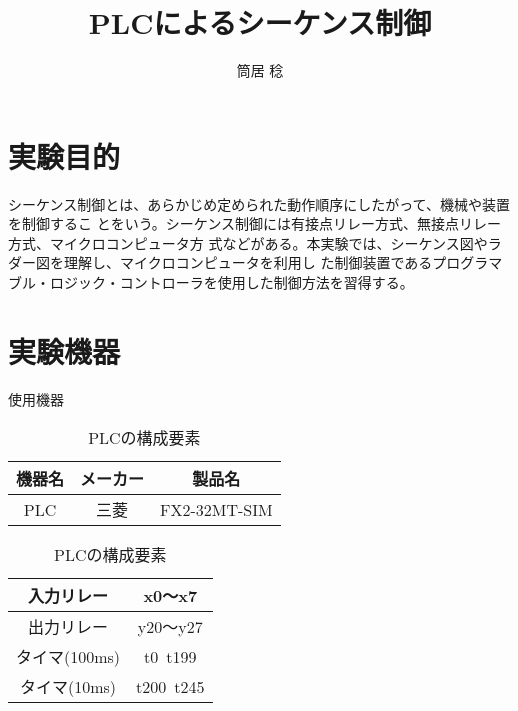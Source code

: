 \documentclass{jsarticle}
\begin{document}

\title{PLCによるシーケンス制御}
\author{筒居 稔}
\maketitle


\section{実験目的}
シーケンス制御とは、あらかじめ定められた動作順序にしたがって、機械や装置を制御するこ
とをいう。シーケンス制御には有接点リレー方式、無接点リレー方式、マイクロコンピュータ方
式などがある。本実験では、シーケンス図やラダー図を理解し、マイクロコンピュータを利用し
た制御装置であるプログラマブル・ロジック・コントローラを使用した制御方法を習得する。
\section{実験機器}
\begin{table}[hbtp]
 \caption{使用機器}
 \centering
  \begin{tabular}{|c|c|c|}\hline
  機器名&メーカー&製品名\\ \hline\hline
  PLC&三菱&FX2-32MT-SIM\\ \hline
  \end{tabular}

 \caption{PLCの構成要素}
 \centering
  \begin{tabular}{|c||c|}\hline
  入力リレー&x0〜x7\\ \hline
  出力リレー&y20〜y27\\ \hline
  タイマ(100ms)&t0~t199\\ \hline
  タイマ(10ms)&t200~t245\\ \hline
  \end{tabular}
\end{table}
\end{document}
